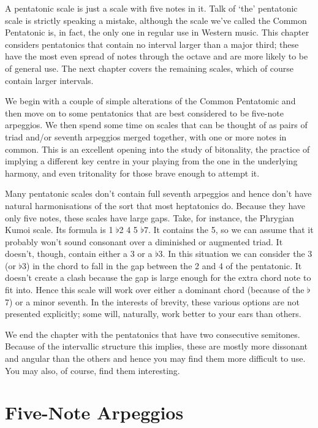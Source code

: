 \documentclass[english]{./gbook}
\begin{document}
\begin{large}
A pentatonic scale is just a scale with five notes in it. Talk of `the' pentatonic scale is strictly speaking a mistake, although the scale we've called the Common Pentatonic is, in fact, the only one in regular use in Western music. This chapter considers pentatonics that contain no interval larger than a major third; these have the most even spread of notes through the octave and are more likely to be of general use. The next chapter covers the remaining scales, which of course contain larger intervals.

We begin with a couple of simple alterations of the Common Pentatomic and then move on to some pentatonics that are best considered to be five-note arpeggios. We then spend some time on scales that can be thought of as pairs of triad and/or seventh arpeggios merged together, with one or more notes in common. This is an excellent opening into the study of bitonality, the practice of implying a different key centre in your playing from the one in the underlying harmony, and even tritonality for those brave enough to attempt it.

Many pentatonic scales don't contain full seventh arpeggios and hence don't have natural harmonisations of the sort that most heptatonics do. Because they have only five notes, these scales have large gaps. Take, for instance, the Phrygian Kumoi scale. Its formula is 1 $\flat$2 4 5 $\flat$7. It contains the 5, so we can assume that it probably won't sound consonant over a diminished or augmented triad. It doesn't, though, contain either a 3 or a $\flat$3. In this situation we can consider the 3 (or $\flat$3) in the chord to fall in the gap between the 2 and 4 of the pentatonic. It doesn't create a clash because the gap is large enough for the extra chord note to fit into. Hence this scale will work over either a dominant chord (because of the $\flat$7) or a minor seventh. In the interests of brevity, these various options are not presented explicitly; some will, naturally, work better to your ears than others.

We end the chapter with the pentatonics that have two consecutive semitones. Because of the intervallic structure this implies, these are mostly more dissonant and angular than the others and hence you may find them more difficult to use. You may also, of course, find them interesting.

\section{Five-Note Arpeggios}


\end{large}
\end{document}
